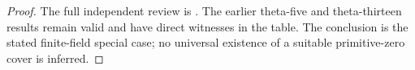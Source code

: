 \begin{proof}
The full independent review is
.
The earlier theta-five and theta-thirteen
results remain valid and have direct
witnesses in the table. The conclusion
is the stated finite-field special case;
no universal existence of a suitable
primitive-zero cover is inferred.
\end{proof}
